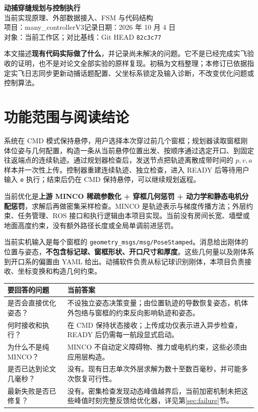 \documentclass[UTF8,fontset=fandol,a4paper,10pt]{ctexart}
\newcommand{\code}[1]{{\small\nolinkurl{#1}}}
\newcommand{\note}[1]{\par\noindent\colorbox{accent!8}{\parbox{\dimexpr\linewidth-2\fboxsep\relax}{#1}}\par}
\begin{document}
\begin{center}
{\LARGE\bfseries 动捕穿缝规划与控制执行}\\[5pt]
{\large 当前实现原理、外部数据接入、FSM 与代码结构}\\[6pt]
{\small 项目：many\_controllerV3\quad 记录日期：2026 年 10 月 4 日}\\
{\small 对象：当前工作区；对比基线：Git HEAD \code{82c3c77}}
\end{center}

\note{本文描述\textbf{现有代码实际做了什么}，并记录尚未解决的问题。它不是已经完成实飞验收的证明，也不是对论文全部实验的原样复现。初稿为文档整理；本修订已依据指定实飞日志同步更新动捕话题配置、父坐标系锁定及输入诊断，不改变优化问题或控制算法。}

\section{功能范围与阅读结论}
系统在 CMD 模式保持悬停，用户选择本次穿过前几个窗框；规划器读取窗框刚体位姿与几何配置，构造一条从当前悬停位置出发、按顺序通过选定开口、到固定往返端点的连续轨迹。通过规划器检查后，发送节点把轨迹离散成带时间的 $p,v,a$ 样本并一次性上传。控制器重建连续轨迹、独立检查，进入 READY 后等待用户输入 \code{e} 执行；结束后仍在 CMD 保持悬停，可以继续规划返程。

当前优化是\textbf{上游 MINCO 稀疏参数化 + 穿框几何惩罚 + 动力学和静态电机分配惩罚}，求解后再做密集采样检查。MINCO 是轨迹表示与梯度传播方法；外层约束、任务管理、ROS 接口和执行逻辑由本项目实现。当前没有房间长宽、墙壁或地面高度约束，没有额外路径长度或全局单调前进惩罚。

当前实机输入是每个窗框的 \code{geometry_msgs/msg/PoseStamped}。消息给出刚体的位置与姿态，\textbf{不包含标记球、窗框形状、开口尺寸和厚度}。这些几何量以及刚体系到开口系的偏置由 YAML 给出。动捕软件负责从标记球识别刚体，本项目负责接收、坐标变换和构造几何约束。

\noindent\begin{tabularx}{\linewidth}{@{}p{30mm}Y@{}}\toprule
要回答的问题 & 当前答案\\\midrule
是否会直接优化姿态？ & 不设独立姿态决策变量；由位置轨迹的导数恢复姿态，机体外包络与窗框的约束反向影响轨迹和姿态。\\
何时接收和执行？ & 在 CMD 保持状态接收；上传成功仅表示进入异步检查，READY 后仍需每一航段显式启动。\\
为什么不是纯 MINCO？ & MINCO 不自动定义障碍物、推力或电机约束，这些必须由应用层构造。\\
是否已达到论文几毫秒？ & 没有。现有日志单次外层求解为数十至数百毫秒，并可能多次恢复可行性。\\
最新失败是否已修复？ & 没有。密集检查发现动态峰值越界后，当前加密机制未把这些峰值时刻完整反馈给优化器，详见第\ref{sec:failure}节。\\\bottomrule
\end{tabularx}
\end{document}
